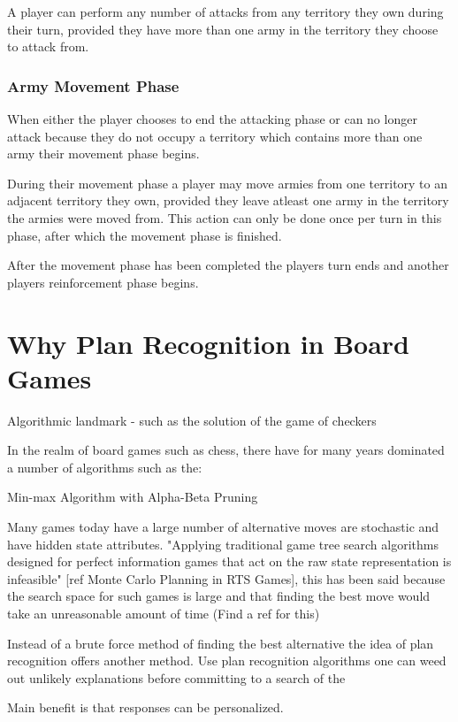 \documentclass[parskip]{cs4rep}
\begin{document}
A player can perform any number of attacks from any territory they own during their turn, provided they have more than one army in the territory they choose to attack from.

\subsubsection{Army Movement Phase}

When either the player chooses to end the attacking phase or can no longer attack because they do not occupy a territory which contains more than one army their movement phase begins.

During their movement phase a player may move armies from one territory to an adjacent territory they own, provided they leave atleast one army in the territory the armies were moved from. This action can only be done once per turn in this phase, after which the movement phase is finished.

After the movement phase has been completed the players turn ends and another players reinforcement phase begins.
\newpage

\section{Why Plan Recognition in Board Games}

Algorithmic landmark - such as the solution of the game of checkers 

In the realm of board games such as chess, there have for many years dominated a number of algorithms such as the:

Min-max Algorithm with Alpha-Beta Pruning

Many games today have a large number of alternative moves are stochastic and have hidden state attributes. "Applying traditional game tree search algorithms designed for perfect information games that act on the raw state representation is infeasible" [ref Monte Carlo Planning in RTS Games], this has been said because the search space for such games is large and that finding the best move would take an unreasonable amount of time (Find a ref for this)

Instead of a brute force method of finding the best alternative the idea of plan recognition offers another method. Use plan recognition algorithms one can weed out unlikely explanations before committing to a search of the 

Main benefit is that responses can be personalized.
\end{document}
